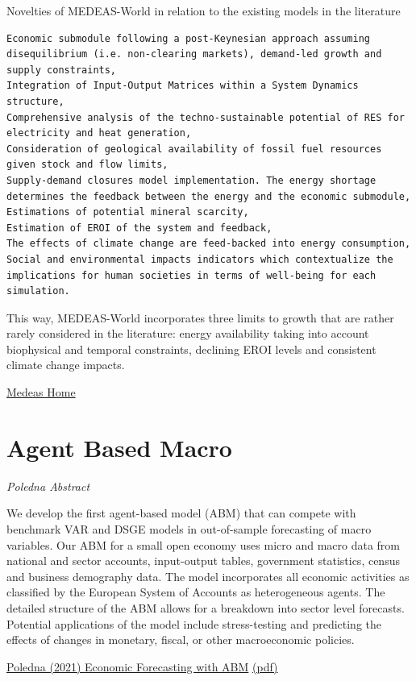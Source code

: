 \documentclass[
]{book}
\begin{document}
Novelties of MEDEAS-World in relation to the existing models in the literature

\begin{verbatim}
Economic submodule following a post-Keynesian approach assuming disequilibrium (i.e. non-clearing markets), demand-led growth and supply constraints,
Integration of Input-Output Matrices within a System Dynamics structure,
Comprehensive analysis of the techno-sustainable potential of RES for electricity and heat generation,
Consideration of geological availability of fossil fuel resources given stock and flow limits,
Supply-demand closures model implementation. The energy shortage determines the feedback between the energy and the economic submodule,
Estimations of potential mineral scarcity,
Estimation of EROI of the system and feedback,
The effects of climate change are feed-backed into energy consumption,
Social and environmental impacts indicators which contextualize the implications for human societies in terms of well-being for each simulation.
\end{verbatim}

This way, MEDEAS-World incorporates three limits to growth that are rather rarely considered in the literature: energy availability taking into account biophysical and temporal constraints, declining EROI levels and consistent climate change impacts.

\href{https://medeas.eu/\#home}{Medeas Home}

\hypertarget{agent-based-macro}{%
\chapter{Agent Based Macro}\label{agent-based-macro}}

\emph{Poledna Abstract}

We develop the first agent-based model (ABM) that can compete with benchmark VAR and DSGE models in
out-of-sample forecasting of macro variables. Our ABM for a small open economy uses micro and macro data
from national and sector accounts, input-output tables, government statistics, census and business demography
data. The model incorporates all economic activities as classified by the European System of Accounts as
heterogeneous agents. The detailed structure of the ABM allows for a breakdown into sector level forecasts.
Potential applications of the model include stress-testing and predicting the effects of changes in monetary,
fiscal, or other macroeconomic policies.

\href{https://www.rebuildingmacroeconomics.ac.uk/research-prize-complexity-macro}{Poledna (2021) Economic Forecasting with ABM}
\href{pdf/Poledna_2021_Economic_Forecasting_ABM.pdf}{(pdf)}
\end{document}
